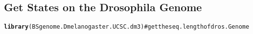\documentclass[11pt, oneside]{article}\usepackage{graphicx, color}
\makeatletter
\newcommand{\hlfunctioncall}[1]{\textcolor[rgb]{0.501960784313725,0,0.329411764705882}{\textbf{#1}}}%
\newcommand{\hlcomment}[1]{\textcolor[rgb]{0.180392156862745,0.6,0.341176470588235}{#1}}%
\newenvironment{kframe}{%
 \def\at@end@of@kframe{}%
 \ifinner\ifhmode%
  \def\at@end@of@kframe{\end{minipage}}%
  \begin{minipage}{\columnwidth}%
 \fi\fi%
 \def\FrameCommand##1{\hskip\@totalleftmargin \hskip-\fboxsep
 \colorbox{shadecolor}{##1}\hskip-\fboxsep
     \hskip-\linewidth \hskip-\@totalleftmargin \hskip\columnwidth}%
 \MakeFramed {\advance\hsize-\width
   \@totalleftmargin\z@ \linewidth\hsize
   \@setminipage}}%
 {\par\unskip\endMakeFramed%
 \at@end@of@kframe}
\newenvironment{knitrout}{}{} %
\makeatother
\begin{document}
\subsection{Get States on the Drosophila Genome}
\begin{knitrout}
\color{fgcolor}\begin{kframe}
\begin{alltt}
\hlfunctioncall{library}(BSgenome.Dmelanogaster.UCSC.dm3)  \hlcomment{#get the seq.length of dros.Genome}
\end{alltt}


{\ttfamily\noindent\itshape\color{messagecolor}{\#\# Loading required package: BSgenome}}

{\ttfamily\noindent\itshape\color{messagecolor}{\#\# Loading required package: Biostrings}}


\end{kframe}
\end{knitrout}
\end{document}
